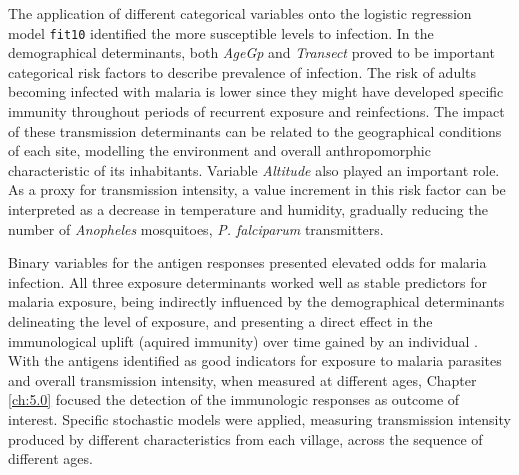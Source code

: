 The application of different categorical variables onto the logistic regression model \texttt{fit10} identified the more susceptible levels to infection.
In the demographical determinants, both \textit{AgeGp} and \textit{Transect} proved to be important categorical risk factors to describe prevalence of infection.
The risk of adults becoming infected with malaria is lower since they might have developed specific immunity throughout periods of recurrent exposure and reinfections.
The impact of these transmission determinants can be related to the geographical conditions of each site, modelling the environment and overall anthropomorphic characteristic of its inhabitants.
Variable \textit{Altitude} also played an important role.
As a proxy for transmission intensity, a value increment in this risk factor can be interpreted as a decrease in temperature and humidity, gradually reducing the number of \textit{Anopheles} mosquitoes, \textit{P. falciparum} transmitters.

Binary variables for the antigen responses presented elevated odds for malaria infection.
All three exposure determinants worked well as stable predictors for malaria exposure, being indirectly influenced by the demographical determinants delineating the level of exposure, and presenting a direct effect in the immunological uplift (aquired immunity) over time gained by an individual \cite{shelton2015genetic}.
With the antigens identified as good indicators for exposure to malaria parasites and overall transmission intensity, when measured at different ages, Chapter \ref{ch:5.0} focused the detection of the immunologic responses as outcome of interest.
Specific stochastic models were applied, measuring transmission intensity produced by different characteristics from each village, across the sequence of different ages.
